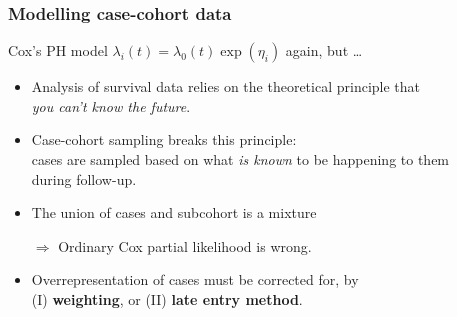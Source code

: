 \documentclass[12pt,dvipsnames,t,handout%
,aspectratio=169%
]{beamer}
\begin{document}
\begin{frame}
  \frametitle{Modelling case-cohort data}

Cox's PH model $\lambda_i(t) = \lambda_0(t)\exp(\eta_i)$ again, but \dots
\pause
  \begin{itemize}
  \item Analysis of survival data relies on the theoretical principle that \\
     {\it you can't know the future}.
 \pause
  \medskip  
  \item  Case-cohort sampling breaks this principle: \\ cases are sampled
    based on what {\it is known} to be happening to them \\ during follow-up.
\pause
  \medskip  
  \item The union of cases and subcohort is a mixture 
\pause
  \item[$\Rightarrow$] Ordinary Cox partial likelihood is wrong.
\pause
 \medskip
 \item 
  Overrepresentation of cases must be corrected for, by \\ 
  (I) \textbf{weighting}, or (II) \textbf{late entry method}.
\end{itemize}

\end{frame}
\end{document}
